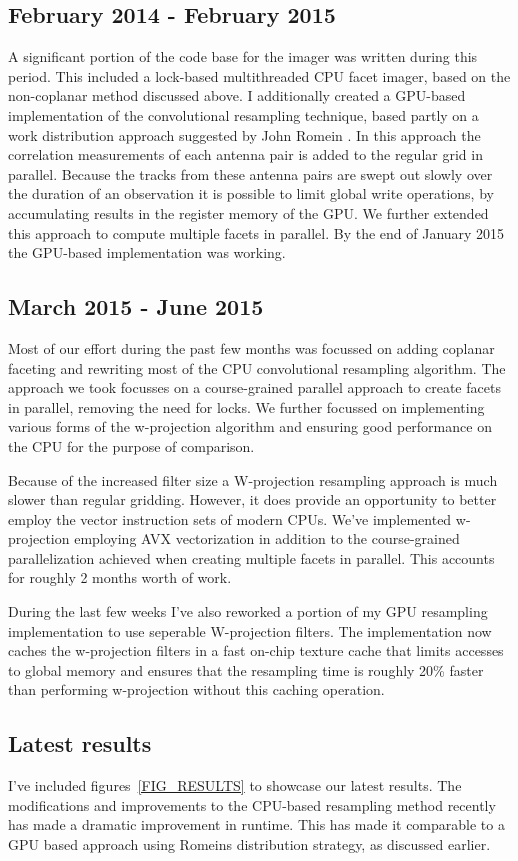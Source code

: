 \documentclass[a4paper,10pt]{article}
\begin{document}
\subsection{February 2014 - February 2015}
A significant portion of the code base for the imager was written during this period. This included a lock-based multithreaded 
CPU facet imager, based on the non-coplanar method discussed above. I additionally created a GPU-based implementation of the
convolutional resampling technique, based partly on a work distribution approach suggested by John Romein \cite{romein2012efficient}.
In this approach the correlation measurements of each antenna pair is added to the regular grid in parallel. Because the tracks from these
antenna pairs are swept out slowly over the duration of an observation it is possible to limit global write operations, by accumulating
results in the register memory of the GPU. We further extended this approach to compute multiple facets in parallel. By the end of January 2015
the GPU-based implementation was working.
\subsection{March 2015 - June 2015}
Most of our effort during the past few months was focussed on adding coplanar faceting and rewriting most of the CPU convolutional resampling algorithm.
The approach we took focusses on a course-grained parallel approach to create facets in parallel, removing the need for locks. We further focussed on implementing
various forms of the w-projection algorithm and ensuring good performance on the CPU for the purpose of comparison. 

Because of the increased filter size a W-projection resampling approach is much slower than regular gridding. However, it does provide an opportunity
to better employ the vector instruction sets of modern CPUs. We've implemented w-projection employing AVX vectorization in addition to the course-grained 
parallelization achieved when creating multiple facets in parallel. This accounts for roughly 2 months worth of work.

During the last few weeks I've also reworked a portion of my GPU resampling implementation to use seperable W-projection filters. The implementation now
caches the w-projection filters in a fast on-chip texture cache that limits accesses to global memory and ensures that the resampling time is roughly 20\% faster than
performing w-projection without this caching operation.
\subsection{Latest results}
I've included figures~\ref{FIG_RESULTS} to showcase our latest results. The modifications and improvements to the CPU-based resampling method
recently has made a dramatic improvement in runtime. This has made it comparable to a GPU based approach using Romeins distribution strategy,
as discussed earlier.
\end{document}
